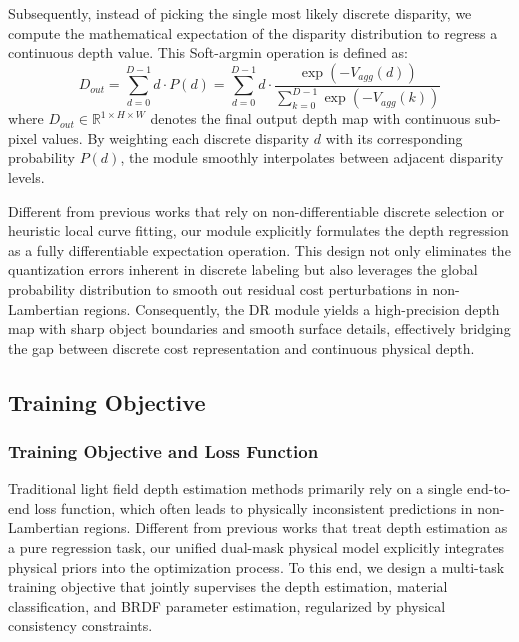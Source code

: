 \documentclass[lettersize,journal]{IEEEtran}
\begin{document}
Subsequently, instead of picking the single most likely discrete disparity, we compute the mathematical expectation of the disparity distribution to regress a continuous depth value. This Soft-argmin operation is defined as:
\begin{equation}
\label{eq:eq17}
D_{out} = \sum_{d=0}^{D-1} d \cdot P(d) = \sum_{d=0}^{D-1} d \cdot \frac{\exp(-V_{agg}(d))}{\sum_{k=0}^{D-1} \exp(-V_{agg}(k))}
\end{equation}
where $D_{out} \in \mathbb{R}^{1 \times H \times W}$ denotes the final output depth map with continuous sub-pixel values. By weighting each discrete disparity $d$ with its corresponding probability $P(d)$, the module smoothly interpolates between adjacent disparity levels.

Different from previous works that rely on non-differentiable discrete selection or heuristic local curve fitting, our module explicitly formulates the depth regression as a fully differentiable expectation operation. This design not only eliminates the quantization errors inherent in discrete labeling but also leverages the global probability distribution to smooth out residual cost perturbations in non-Lambertian regions. Consequently, the DR module yields a high-precision depth map with sharp object boundaries and smooth surface details, effectively bridging the gap between discrete cost representation and continuous physical depth.

\subsection{Training Objective}

\subsubsection{Training Objective and Loss Function}

Traditional light field depth estimation methods primarily rely on a single end-to-end loss function, which often leads to physically inconsistent predictions in non-Lambertian regions. Different from previous works that treat depth estimation as a pure regression task, our unified dual-mask physical model explicitly integrates physical priors into the optimization process. To this end, we design a multi-task training objective that jointly supervises the depth estimation, material classification, and BRDF parameter estimation, regularized by physical consistency constraints.
\end{document}
